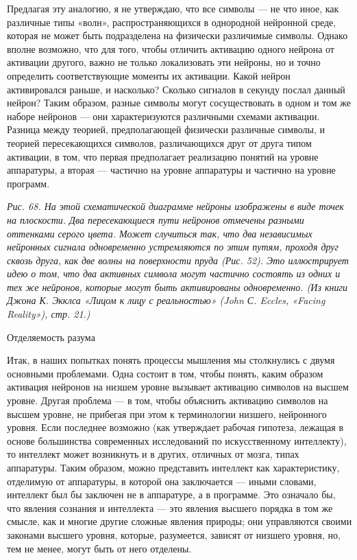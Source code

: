 \documentclass[../main.tex]{subfiles}
\begin{document}
Предлагая эту аналогию, я не утверждаю, что все символы --- не что иное, как различные типы «волн», распространяющихся в однородной нейронной среде, которая не может быть подразделена на физически различимые символы. Однако вполне возможно, что для того, чтобы отличить активацию одного нейрона от активации другого, важно не только локализовать эти нейроны, но и точно определить соответствующие моменты их активации. Какой нейрон активировался раньше, и насколько? Сколько сигналов в секунду послал данный нейрон? Таким образом, разные символы могут сосуществовать в одном и том же наборе нейронов --- они характеризуются различными схемами активации. Разница между теорией, предполагающей физически различные символы, и теорией пересекающихся символов, различающихся друг от друга типом активации, в том, что первая предполагает реализацию понятий на уровне аппаратуры, а вторая --- частично на уровне аппаратуры и частично на уровне программ.

\emph{Рис. 68. На этой схематической диаграмме нейроны изображены в виде точек на плоскости. Два пересекающиеся пути нейронов отмечены разными оттенками серого цвета. Может случиться так, что два независимых нейронных сигнала одновременно устремляются по этим путям, проходя друг сквозь друга, как две волны на поверхности пруда (Рис. 52). Это иллюстрирует идею о том, что два активных символа могут частично состоять из одних и тех же нейронов, которые могут быть активированы одновременно. (Из книги Джона К. Экклса «Лицом к лицу с реальностью» (John С. Eccles, «Facing Reality»), стр. 21.)}

Отделяемость разума

Итак, в наших попытках понять процессы мышления мы столкнулись с двумя основными проблемами. Одна состоит в том, чтобы понять, каким образом активация нейронов на низшем уровне вызывает активацию символов на высшем уровне. Другая проблема --- в том, чтобы объяснить активацию символов на высшем уровне, не прибегая при этом к терминологии низшего, нейронного уровня. Если последнее возможно (как утверждает рабочая гипотеза, лежащая в основе большинства современных исследований по искусственному интеллекту), то интеллект может возникнуть и в других, отличных от мозга, типах аппаратуры. Таким образом, можно представить интеллект как характеристику, отделимую от аппаратуры, в которой она заключается --- иными словами, интеллект был бы заключен не в аппаратуре, а в программе. Это означало бы, что явления сознания и интеллекта --- это явления высшего порядка в том же смысле, как и многие другие сложные явления природы; они управляются своими законами высшего уровня, которые, разумеется, зависят от низшего уровня, но, тем не менее, могут быть от него отделены.
\end{document}
